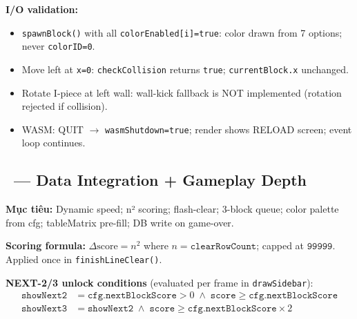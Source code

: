\documentclass[12pt,a4paper]{article}
\begin{document}
\noindent\textbf{I/O validation:}
\begin{itemize}[nosep]
  \item \texttt{spawnBlock()} with all \texttt{colorEnabled[i]=true}:
        color drawn from 7 options; never \texttt{colorID=0}.
  \item Move left at \texttt{x=0}: \texttt{checkCollision} returns
        \texttt{true}; \texttt{currentBlock.x} unchanged.
  \item Rotate I-piece at left wall: wall-kick fallback is NOT
        implemented (rotation rejected if collision).
  \item WASM: QUIT $\rightarrow$ \texttt{wasmShutdown=true};
        render shows RELOAD screen; event loop continues.
\end{itemize}

\subsection{\Vtwo\ --- Data Integration + Gameplay Depth}

\textbf{Mục tiêu:} Dynamic speed; n² scoring; flash-clear; 3-block queue;
color palette from cfg; tableMatrix pre-fill; DB write on game-over.

\noindent\textbf{Scoring formula:}
$\Delta\text{score} = n^2$ where $n = \texttt{clearRowCount}$;
capped at $\texttt{99999}$. Applied once in \texttt{finishLineClear()}.

\noindent\textbf{NEXT-2/3 unlock conditions} (evaluated per frame in
\texttt{drawSidebar}):
\begin{align*}
  \texttt{showNext2} &= \texttt{cfg.nextBlockScore} > 0
    \;\wedge\; \texttt{score} \geq \texttt{cfg.nextBlockScore} \\
  \texttt{showNext3} &= \texttt{showNext2}
    \;\wedge\; \texttt{score} \geq \texttt{cfg.nextBlockScore} \times 2
\end{align*}
\end{document}
